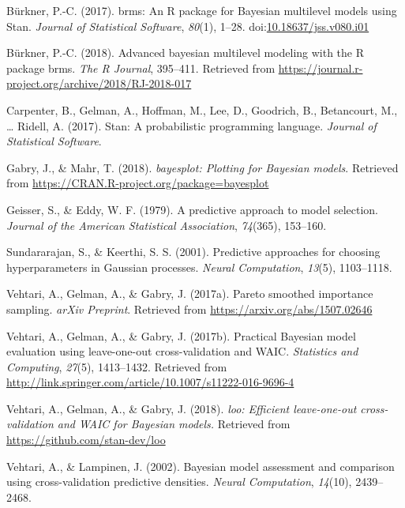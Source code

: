 \documentclass[english,,doc,floatsintext]{apa6}
\theoremstyle{definition}
\theoremstyle{definition}
\theoremstyle{definition}
\theoremstyle{remark}
\begin{document}
\leavevmode\hypertarget{ref-brms1}{}%
Bürkner, P.-C. (2017). brms: An R package for Bayesian multilevel models
using Stan. \emph{Journal of Statistical Software}, \emph{80}(1), 1--28.
doi:\href{https://doi.org/10.18637/jss.v080.i01}{10.18637/jss.v080.i01}

\leavevmode\hypertarget{ref-brms2}{}%
Bürkner, P.-C. (2018). Advanced bayesian multilevel modeling with the R
package brms. \emph{The R Journal}, 395--411. Retrieved from
\url{https://journal.r-project.org/archive/2018/RJ-2018-017}

\leavevmode\hypertarget{ref-carpenter2017}{}%
Carpenter, B., Gelman, A., Hoffman, M., Lee, D., Goodrich, B.,
Betancourt, M., \ldots{} Ridell, A. (2017). Stan: A probabilistic
programming language. \emph{Journal of Statistical Software}.

\leavevmode\hypertarget{ref-bayesplot}{}%
Gabry, J., \& Mahr, T. (2018). \emph{bayesplot: Plotting for Bayesian
models}. Retrieved from
\url{https://CRAN.R-project.org/package=bayesplot}

\leavevmode\hypertarget{ref-geisser1979}{}%
Geisser, S., \& Eddy, W. F. (1979). A predictive approach to model
selection. \emph{Journal of the American Statistical Association},
\emph{74}(365), 153--160.

\leavevmode\hypertarget{ref-sundararajan2001}{}%
Sundararajan, S., \& Keerthi, S. S. (2001). Predictive approaches for
choosing hyperparameters in Gaussian processes. \emph{Neural
Computation}, \emph{13}(5), 1103--1118.

\leavevmode\hypertarget{ref-vehtari2017psis}{}%
Vehtari, A., Gelman, A., \& Gabry, J. (2017a). Pareto smoothed
importance sampling. \emph{arXiv Preprint}. Retrieved from
\url{https://arxiv.org/abs/1507.02646}

\leavevmode\hypertarget{ref-vehtari2017loo}{}%
Vehtari, A., Gelman, A., \& Gabry, J. (2017b). Practical Bayesian model
evaluation using leave-one-out cross-validation and WAIC.
\emph{Statistics and Computing}, \emph{27}(5), 1413--1432. Retrieved
from \url{http://link.springer.com/article/10.1007/s11222-016-9696-4}

\leavevmode\hypertarget{ref-loo2018}{}%
Vehtari, A., Gelman, A., \& Gabry, J. (2018). \emph{loo: Efficient
leave-one-out cross-validation and WAIC for Bayesian models.} Retrieved
from \url{https://github.com/stan-dev/loo}

\leavevmode\hypertarget{ref-vehtari2002}{}%
Vehtari, A., \& Lampinen, J. (2002). Bayesian model assessment and
comparison using cross-validation predictive densities. \emph{Neural
Computation}, \emph{14}(10), 2439--2468.
\end{document}
